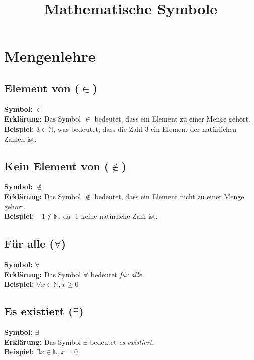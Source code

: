 \documentclass[12pt,a4paper]{article}
\begin{document}
\title{Mathematische Symbole}
\author{}
\date{}

\maketitle

\tableofcontents
\newpage

\section{Mengenlehre}

\subsection{Element von (\texorpdfstring{$\in$}{in})}
\textbf{Symbol:} $\in$ \\
\textbf{Erklärung:} Das Symbol $\in$ bedeutet, dass ein Element zu einer Menge gehört. \\
\textbf{Beispiel:} $3 \in \mathbb{N}$, was bedeutet, dass die Zahl 3 ein Element der natürlichen Zahlen ist.

\subsection{Kein Element von (\texorpdfstring{$\notin$}{notin})}
\textbf{Symbol:} $\notin$ \\
\textbf{Erklärung:} Das Symbol $\notin$ bedeutet, dass ein Element nicht zu einer Menge gehört. \\
\textbf{Beispiel:} $-1 \notin \mathbb{N}$, da -1 keine natürliche Zahl ist.

\subsection{Für alle (\texorpdfstring{$\forall$}{forall})}
\textbf{Symbol:} $\forall$ \\
\textbf{Erklärung:} Das Symbol $\forall$ bedeutet \textit{für alle}. \\
\textbf{Beispiel:} $\forall x \in \mathbb{N}, x \geq 0$

\subsection{Es existiert (\texorpdfstring{$\exists$}{exists})}
\textbf{Symbol:} $\exists$ \\
\textbf{Erklärung:} Das Symbol $\exists$ bedeutet \textit{es existiert}. \\
\textbf{Beispiel:} $\exists x \in \mathbb{N}, x = 0$
\end{document}
